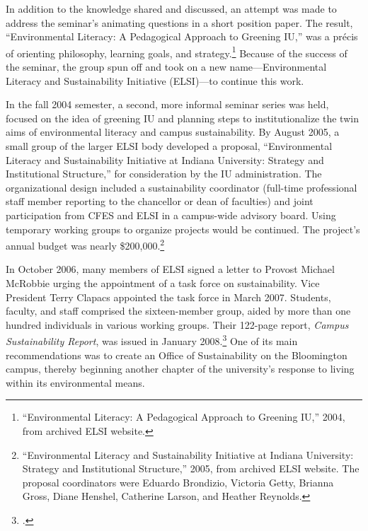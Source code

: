 \documentclass[
  american,
  letterpaper,
]{scrreprt}
\begin{document}
In addition to the knowledge shared and discussed, an attempt was made
to address the seminar's animating questions in a short position paper.
The result, ``Environmental Literacy: A Pedagogical Approach to Greening
IU,'' was a précis of orienting philosophy, learning goals, and
strategy.\footnote{``Environmental Literacy: A Pedagogical Approach to
  Greening IU,'' 2004, from archived ELSI website.} Because of the
success of the seminar, the group spun off and took on a new
name---Environmental Literacy and Sustainability Initiative (ELSI)---to
continue this work.

In the fall 2004 semester, a second, more informal seminar series was
held, focused on the idea of greening IU and planning steps to
institutionalize the twin aims of environmental literacy and campus
sustainability. By August 2005, a small group of the larger ELSI body
developed a proposal, ``Environmental Literacy and Sustainability
Initiative at Indiana University: Strategy and Institutional
Structure,'' for consideration by the IU administration. The
organizational design included a sustainability coordinator (full-time
professional staff member reporting to the chancellor or dean of
faculties) and joint participation from CFES and ELSI in a campus-wide
advisory board. Using temporary working groups to organize projects
would be continued. The project's annual budget was nearly
\$200,000.\footnote{``Environmental Literacy and Sustainability
  Initiative at Indiana University: Strategy and Institutional
  Structure,'' 2005, from archived ELSI website. The proposal
  coordinators were Eduardo Brondizio, Victoria Getty, Brianna Gross,
  Diane Henshel, Catherine Larson, and Heather Reynolds.}

In October 2006, many members of ELSI signed a letter to Provost Michael
McRobbie urging the appointment of a task force on sustainability. Vice
President Terry Clapacs appointed the task force in March 2007.
Students, faculty, and staff comprised the sixteen-member group, aided
by more than one hundred individuals in various working groups. Their
122-page report, \emph{Campus Sustainability Report}, was issued in
January 2008.\footnote{.} One of its main
recommendations was to create an Office of Sustainability on the
Bloomington campus, thereby beginning another chapter of the
university's response to living within its environmental means.
\end{document}
